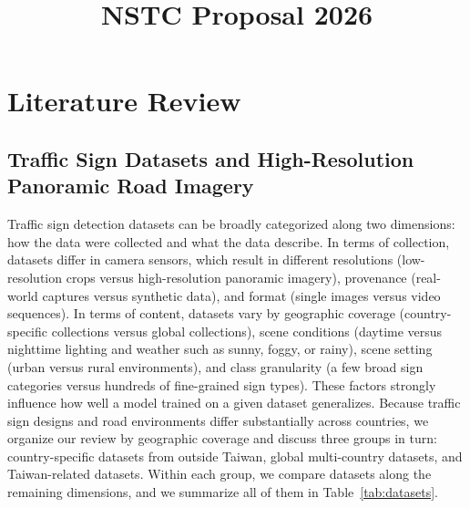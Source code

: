 \documentclass[runningheads]{llncs}
\begin{document}
%
\title{NSTC Proposal 2026}
%
\maketitle
%
\section{Literature Review}
\subsection{Traffic Sign Datasets and High-Resolution Panoramic Road Imagery}
Traffic sign detection datasets can be broadly categorized along two dimensions: how the data were collected and what the data describe. In terms of collection, datasets differ in camera sensors, which result in different resolutions (low-resolution crops versus high-resolution panoramic imagery), provenance (real-world captures versus synthetic data), and format (single images versus video sequences). In terms of content, datasets vary by geographic coverage (country-specific collections versus global collections), scene conditions (daytime versus nighttime lighting and weather such as sunny, foggy, or rainy), scene setting (urban versus rural environments), and class granularity (a few broad sign categories versus hundreds of fine-grained sign types). These factors strongly influence how well a model trained on a given dataset generalizes. Because traffic sign designs and road environments differ substantially across countries, we organize our review by geographic coverage and discuss three groups in turn: country-specific datasets from outside Taiwan, global multi-country datasets, and Taiwan-related datasets. Within each group, we compare datasets along the remaining dimensions, and we summarize all of them in Table~\ref{tab:datasets}.
\end{document}
